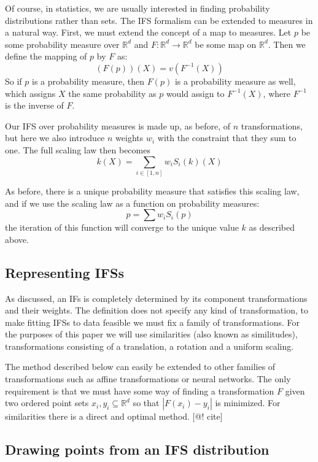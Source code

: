 \documentclass[11pt, twocolumn]{article}
\theoremstyle{definition}
\begin{document}
Of course, in statistics, we are usually interested in finding probability distributions rather than sets. The IFS formalism can be extended to measures in a natural way. First, we must extend the concept of a map to measures. Let $p$ be some probability measure over ${\mathbb R}^d$ and $F:{\mathbb R}^d \rightarrow {\mathbb R}^d$ be some map on ${\mathbb R}^d$. Then we define the mapping of $p$ by $F$ as:
\[
(F(p))(X) = v(F^{-1}(X))
\]
So if $p$ is a probability measure, then $F(p)$ is a probability measure as well, which assigns $X$ the same probability as $p$ would assign to $F^{-1}(X)$, where $F^{-1}$ is the inverse of $F$.

Our IFS over probability measures is made up, as before, of $n$ transformations, but here we also introduce $n$ weights $w_i$ with the constraint that they sum to one. The full scaling law then becomes
\[
k(X) = \sum_{i\in[1, n]} w_i S_i(k)(X)
\] 

As before, there is a unique probability measure that satisfies this scaling law, and if we use the scaling law as a function on probability measures:
\[
p = \sum w_i S_i(p)
\]
the iteration of this function will converge to the unique value $k$ as described above.

\subsection{Representing IFSs}

As discussed, an IFs is completely determined by its component transformations and their weights. The definition does not specify any kind of transformation, to make fitting IFSs to data feasible we must fix a family of transformations. For the purposes of this paper we will use similarities (also known as similitudes), transformations consisting of a translation, a rotation and a uniform scaling.

The method described below can easily be extended to other families of transformations such as affine transformations or neural networks. The only requirement is that we must have some way of finding a transformation $F$ given two ordered point sets ${x_i}, {y_i} \subseteq {\mathbb R}^d$ so that $|F(x_i) - y_i|$ is minimized. For similarities there is a direct and optimal method. [@! cite]

\subsection{Drawing points from an IFS distribution}
\end{document}
